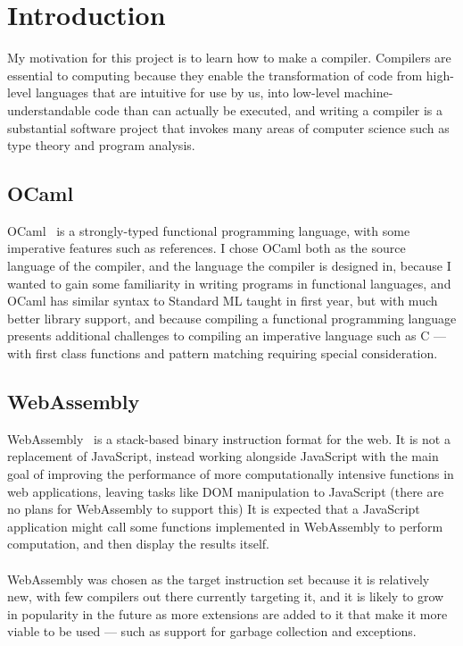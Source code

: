 \chapter{Introduction}

My motivation for this project is to learn how to make a compiler. Compilers are essential to computing because they enable the transformation of code from high-level languages that are intuitive for use by us, into low-level machine-understandable code than can actually be executed, and writing a compiler is a substantial software project that invokes many areas of computer science such as type theory and program analysis.


\section{OCaml}
OCaml~\cite{OCaml} is a strongly-typed functional programming language, with some imperative features such as references. I chose OCaml both as the source language of the compiler, and the language the compiler is designed in, because I wanted to gain some familiarity in writing programs in functional languages, and OCaml has similar syntax to Standard ML taught in first year, but with much better library support, and because compiling a functional programming language presents additional challenges to compiling an imperative language such as C --- with first class functions and pattern matching requiring special consideration.

\section{WebAssembly}
WebAssembly~\cite{webassembly} is a stack-based binary instruction format for the web. It is not a replacement of JavaScript, instead working alongside JavaScript with the main goal of improving the performance of  more computationally intensive functions in web applications, leaving tasks like DOM manipulation to JavaScript (there are no plans for WebAssembly to support this) It  is  expected  that  a  JavaScript  application might  call  some  functions  implemented  in  WebAssembly  to  perform  computation,  and then display the results itself.
\\\\
WebAssembly was chosen as the target instruction set because it is relatively new, with few compilers out there currently targeting it, and it is likely to grow in popularity in the future as more extensions are added to it that make it more viable to be used --- such as support for garbage collection and exceptions.

